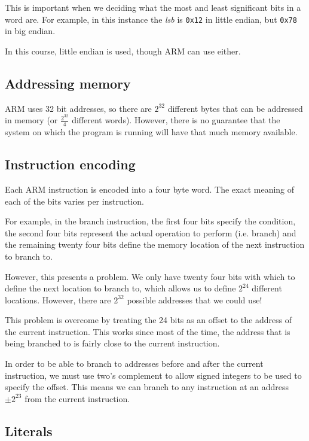 This is important when we deciding what the most and least significant bits in a
word are. For example, in this instance the {\it lsb} is {\tt 0x12} in little
endian, but {\tt 0x78} in big endian.

In this course, little endian is used, though ARM can use either.

\subsection{Addressing memory}

ARM uses 32 bit addresses, so there are $2^{32}$ different bytes that can be addressed in memory (or $\frac{2^{32}}{4}$ different words). However, there is no guarantee that the system on which the program is running will have that much memory available.

\subsection{Instruction encoding}

Each ARM instruction is encoded into a four byte word. The exact meaning of each of the bits varies per instruction.

For example, in the branch instruction, the first four bits specify the condition, the second four bits represent the actual operation to perform (i.e. branch) and the remaining twenty four bits define the memory location of the next instruction to branch to.

However, this presents a problem. We only have twenty four bits with which to define the next location to branch to, which allows us to define $2^24$ different locations. However, there are $2^32$ possible addresses that we could use!

This problem is overcome by treating the 24 bits as an offset to the address of the current instruction. This works since most of the time, the address that is being branched to is fairly close to the current instruction.

In order to be able to branch to addresses before and after the current instruction, we must use two's complement to allow signed integers to be used to specify the offset. This means we can branch to any instruction at an address $\pm 2^{23}$ from the current instruction.

\subsection{Literals}

